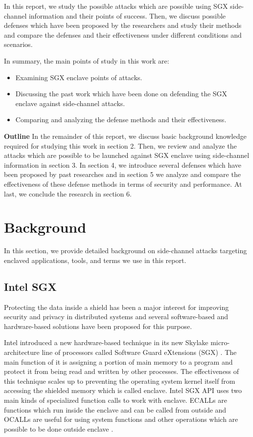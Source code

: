 In this report, we study the possible attacks which are possible using SGX side-channel information and their points of success. Then, we discuss possible defenses which have been proposed by the researchers and study their methods and compare the defenses and their effectiveness under different conditions and scenarios.

In summary, the main points of study in this work are:
\begin{itemize}
	\item Examining SGX enclave points of attacks.
	\item Discussing the past work which have been done on defending the SGX enclave against side-channel attacks.
	\item Comparing and analyzing the defense methods and their effectiveness.
\end{itemize} 
\textbf{Outline} In the remainder of this report, we discuss basic background knowledge required for studying this work in section 2. Then, we review and analyze the attacks which are possible to be launched against SGX enclave using side-channel information in section 3. In section 4, we introduce several defenses which have been proposed by past researches and in section 5 we analyze and compare the effectiveness of these defense methods in terms of security and performance. At last, we conclude the research in section 6.
\section{Background}
In this section, we provide detailed background on side-channel attacks targeting enclaved applications, tools, and terms we use in this report.

\subsection{Intel SGX}

Protecting the data inside a shield has been a major interest for improving security and privacy in distributed systems and several software-based and hardware-based solutions have been proposed for this purpose.

Intel introduced a new hardware-based technique in its new Skylake micro-architecture \cite{skylake} line of processors called Software Guard eXtensions (SGX) \cite{sgx}. The main function of it is assigning a portion of main memory to a program and protect it from being read and written by other processes. The effectiveness of this technique scales up to preventing the operating system kernel itself from accessing the shielded memory which is called enclave. Intel SGX API \cite{sgxapi} uses two main kinds of specialized function calls to work with enclave. ECALLs are functions which run inside the enclave and can be called from outside and OCALLs are useful for using system functions and other operations which are possible to be done outside enclave \cite{ecallocall}.

